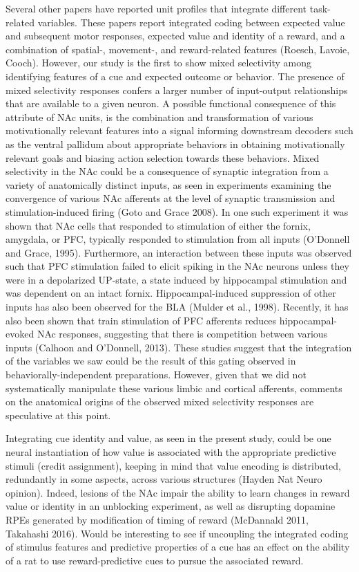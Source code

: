 \documentclass[11pt]{article}
\begin{document}
Several other papers have reported unit profiles that integrate different task-related variables. These papers report integrated coding between expected value and subsequent motor responses, expected value and identity of a reward, and a combination of spatial-, movement-, and reward-related features (Roesch, Lavoie, Cooch). However, our study is the first to show mixed selectivity among identifying features of a cue and expected outcome or behavior. The presence of mixed selectivity responses confers a larger number of input-output relationships that are available to a given neuron. A possible functional consequence of this attribute of NAc units, is the combination and transformation of various motivationally relevant features into a signal informing downstream decoders such as the ventral pallidum about appropriate behaviors in obtaining motivationally relevant goals and biasing action selection towards these behaviors. 
Mixed selectivity in the NAc could be a consequence of synaptic integration from a variety of anatomically distinct inputs, as seen in experiments examining the convergence of various NAc afferents at the level of synaptic transmission and stimulation-induced firing (Goto and Grace 2008). In one such experiment it was shown that NAc cells that responded to stimulation of either the fornix, amygdala, or PFC, typically responded to stimulation from all inputs (O’Donnell and Grace, 1995). Furthermore, an interaction between these inputs was observed such that PFC stimulation failed to elicit spiking in the NAc neurons unless they were in a depolarized UP-state, a state induced by hippocampal stimulation and was dependent on an intact fornix. Hippocampal-induced suppression of other inputs has also been observed for the BLA (Mulder et al., 1998). Recently, it has also been shown that train stimulation of PFC afferents reduces hippocampal-evoked NAc responses, suggesting that there is competition between various inputs (Calhoon and O’Donnell, 2013). These studies suggest that the integration of the variables we saw could be the result of this gating observed in behaviorally-independent preparations. However, given that we did not systematically manipulate these various limbic and cortical afferents, comments on the anatomical origins of the observed mixed selectivity responses are speculative at this point.

Integrating cue identity and value, as seen in the present study, could be one neural instantiation of how value is associated with the appropriate predictive stimuli (credit assignment), keeping in mind that value encoding is distributed, redundantly in some aspects, across various structures (Hayden Nat Neuro opinion). Indeed, lesions of the NAc impair the ability to learn changes in reward value or identity in an unblocking experiment, as well as disrupting dopamine RPEs generated by modification of timing of reward (McDannald 2011, Takahashi 2016). Would be interesting to see if uncoupling the integrated coding of stimulus features and predictive properties of a cue has an effect on the ability of a rat to use reward-predictive cues to pursue the associated reward.
\end{document}
